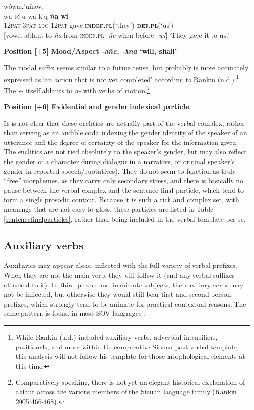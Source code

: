 \documentclass[output=paper]{LSP/langsci}
\begin{document}
\begin{exe}
\ex \glll  w\'owak'\k{u}\~nawi  \\
wa-\textbf{$\varnothing$}-u-wa-k'\k{u}-\textbf{\~na}-\textbf{wi}    \\
\textsc{12pat-3pat-loc-12pat-}gave-\textbf{\textsc{indef.pl}}(`they')-\textbf{\textsc{def.pl}}(`us')  \\     

[vowel ablaut to \textit{\~na} from \textsc{indef.pl} \textit{-\~ne} when before \textit{-wi}]
\trans `They gave it to us.'  \citep[240]{Whitman1947}
\end{exe} 

\textbf{Position [+5]} \textbf{Mood/Aspect \textit{-h\~ne, -hna} `will, shall'}

The modal suffix seems similar to a future tense, but probably is more accurately expressed as `an action that is not yet completed' according to Rankin (n.d.).\footnote{While Rankin (n.d.) included auxiliary verbs, adverbial intensifiers, positionals, and more within his comparative Siouan post-verbal template, this analysis will not follow his template for those morphological elements at this time.}   The \textit{e-} itself ablauts to \textit{a-} with verbs of motion.\footnote{Comparatively speaking, there is not yet an elegant historical explanation of ablaut across the various members of the Siouan language family (Rankin 2005:466-468).}  

\vspace{1em}
\textbf{Position [+6]  Evidential and gender indexical particle.}

It is not clear that these enclitics are actually part of the verbal complex, rather than serving as an audible coda indexing the gender identity of the speaker of an utterance and the degree of certainty of the speaker for the information given. The enclitics are not tied absolutely to the speaker's gender, but may also reflect the gender of a character during dialogue in a narrative, or original speaker's gender in reported speech/quotatives).  They do not seem to function as truly ``free'' morphemes, as they carry only secondary stress, and there is basically no pause between the verbal complex and the sentence-final particle, which tend to form a single prosodic contour.  Because it is such a rich and complex set, with meanings that are not easy to gloss, these particles are listed in Table \ref{sentencefinalparticles}, rather than being included in the verbal template per se.   

\subsection{Auxiliary verbs}
Auxiliaries may appear alone, inflected with the full variety of verbal prefixes. When they are not the main verb, they will follow it (and any verbal suffixes attached to it).  In third person and inanimate subjects, the auxiliary verbs may not be inflected, but otherwise they would still bear first and second person prefixes, which strongly tend to be animate for practical contextual reasons.  The same pattern is found in most SOV languages \citep[490]{Rankin2005}.  
\end{document}
